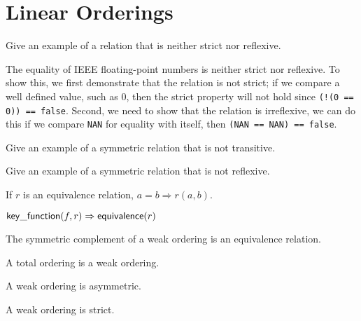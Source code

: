 \chapter{Linear Orderings}

\begin{exercise}
	Give an example of a relation that is neither strict nor reflexive.
\end{exercise}

\begin{solution}
	The equality of IEEE floating-point numbers is neither strict nor reflexive. To show this, we first
	demonstrate that the relation is not strict; if we compare a well defined value, such as 0, then
	the strict property will not hold since \verb|(!(0 == 0)) == false|. Second, we need to show that
	the relation is irreflexive, we can do this if we compare \verb|NAN| for equality with itself, then
	\verb|(NAN == NAN) == false|.

	
\end{solution}

\begin{exercise}
	Give an example of a symmetric relation that is not transitive.
\end{exercise}

\begin{exercise}
	Give an example of a symmetric relation that is not reflexive.
\end{exercise}

\begin{lemma}
	If $r$ is an equivalence relation, $a = b \Rightarrow r(a, b)$.
\end{lemma}

\begin{lemma}
	$\mathsf{key\_function}(f, r) \Rightarrow \mathsf{equivalence}(r)$
\end{lemma}

\begin{lemma}
	The symmetric complement of a weak ordering is an equivalence relation.
\end{lemma}

\begin{lemma}
	A total ordering is a weak ordering.
\end{lemma}

\begin{lemma}
	A weak ordering is asymmetric.
\end{lemma}

\begin{lemma}
	A weak ordering is strict.
\end{lemma}

